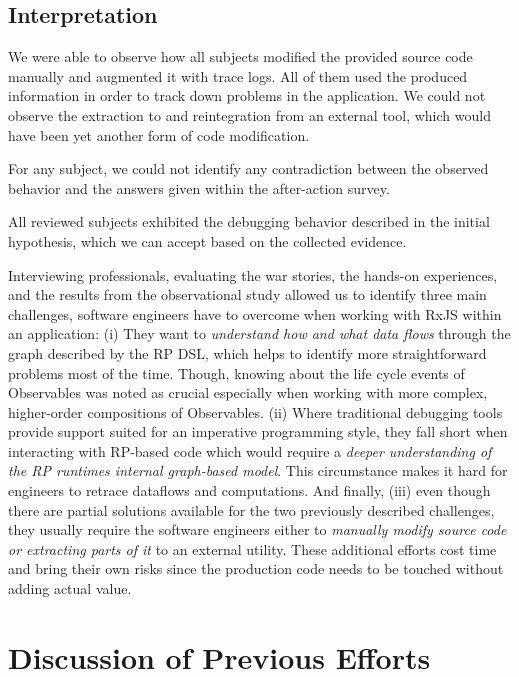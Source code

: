 \documentclass[12pt,a4paper]{article}
\begin{document}
\subsection{Interpretation}

We were able to observe how all subjects modified the provided source code manually and augmented it with trace logs. All of them used the produced information in order to track down problems in the application. We could not observe the extraction to and reintegration from an external tool, which would have been yet another form of code modification.

For any subject, we could not identify any contradiction between the observed behavior and the answers given within the after-action survey.

All reviewed subjects exhibited the debugging behavior described in the initial hypothesis, which we can accept based on the collected evidence.

Interviewing professionals, evaluating the war stories, the hands-on experiences, and the results from the observational study allowed us to identify three main challenges, software engineers have to overcome when working with RxJS within an application: (i) They want to \emph{understand how and what data flows} through the graph described by the RP DSL, which helps to identify more straightforward problems most of the time. Though, knowing about the life cycle events of Observables was noted as crucial especially when working with more complex, higher-order compositions of Observables. (ii) Where traditional debugging tools provide support suited for an imperative programming style, they fall short when interacting with RP-based code which would require a \emph{deeper understanding of the RP runtimes internal graph-based model}. This circumstance makes it hard for engineers to retrace dataflows and computations. And finally, (iii) even though there are partial solutions available for the two previously described challenges, they usually require the software engineers either to \emph{manually modify source code or extracting parts of it} to an external utility. These additional efforts cost time and bring their own risks since the production code needs to be touched without adding actual value.

\section{Discussion of Previous Efforts}
\label{sec:discussion}
\end{document}
